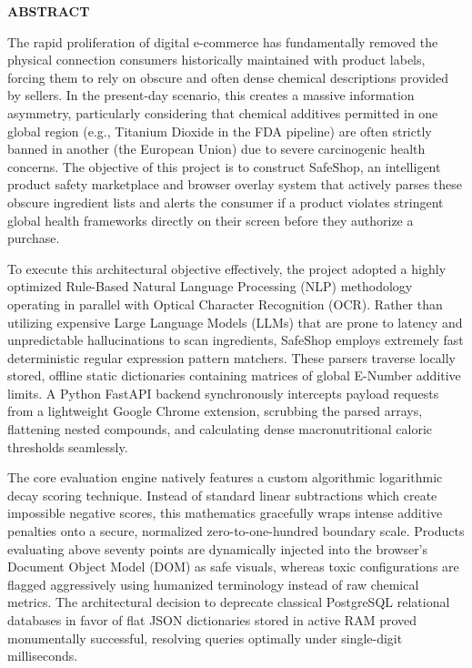 \documentclass[12pt,a4paper]{report}
\begin{document}
\newpage
\begin{center}
{\fontsize{14}{16}\bfseries ABSTRACT}
\end{center}
\vspace{1cm}
The rapid proliferation of digital e-commerce has fundamentally removed the physical connection consumers historically maintained with product labels, forcing them to rely on obscure and often dense chemical descriptions provided by sellers. In the present-day scenario, this creates a massive information asymmetry, particularly considering that chemical additives permitted in one global region (e.g., Titanium Dioxide in the FDA pipeline) are often strictly banned in another (the European Union) due to severe carcinogenic health concerns. The objective of this project is to construct SafeShop, an intelligent product safety marketplace and browser overlay system that actively parses these obscure ingredient lists and alerts the consumer if a product violates stringent global health frameworks directly on their screen before they authorize a purchase.

To execute this architectural objective effectively, the project adopted a highly optimized Rule-Based Natural Language Processing (NLP) methodology operating in parallel with Optical Character Recognition (OCR). Rather than utilizing expensive Large Language Models (LLMs) that are prone to latency and unpredictable hallucinations to scan ingredients, SafeShop employs extremely fast deterministic regular expression pattern matchers. These parsers traverse locally stored, offline static dictionaries containing matrices of global E-Number additive limits. A Python FastAPI backend synchronously intercepts payload requests from a lightweight Google Chrome extension, scrubbing the parsed arrays, flattening nested compounds, and calculating dense macronutritional caloric thresholds seamlessly. 

The core evaluation engine natively features a custom algorithmic logarithmic decay scoring technique. Instead of standard linear subtractions which create impossible negative scores, this mathematics gracefully wraps intense additive penalties onto a secure, normalized zero-to-one-hundred boundary scale. Products evaluating above seventy points are dynamically injected into the browser's Document Object Model (DOM) as safe visuals, whereas toxic configurations are flagged aggressively using humanized terminology instead of raw chemical metrics. The architectural decision to deprecate classical PostgreSQL relational databases in favor of flat JSON dictionaries stored in active RAM proved monumentally successful, resolving queries optimally under single-digit milliseconds.
\end{document}
